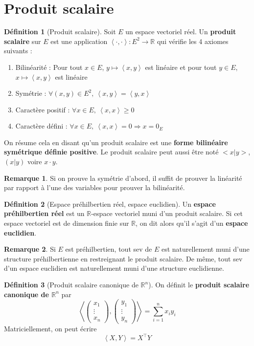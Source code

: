 \documentclass[french]{book}
\newcommand{\R}{\mathbb{R}}
\theoremstyle{plain}
\theoremstyle{definition}
\newtheorem{dfn}{Définition}[chapter]
\newtheorem{rmq}{Remarque}[chapter]
\theoremstyle{remark}
\begin{document}
\section{Produit scalaire}
\begin{dfn}[Produit scalaire]
	Soit $E$ un espace vectoriel réel. Un \textbf{produit scalaire} sur $E$ est une application $\left\langle\cdot,\cdot\right\rangle:E^2\rightarrow\R$ qui vérifie les 4 axiomes suivants :
	\begin{enumerate}
		\item Bilinéarité : Pour tout $x\in E$, $y\mapsto\left\langle x,y\right\rangle$ est linéaire et pour tout $y\in E$, $x\mapsto\left\langle x,y\right\rangle$ est linéaire
		\item Symétrie : $\forall(x,y)\in E^2,\ \left\langle x,y\right\rangle=\left\langle y,x\right\rangle$
		\item Caractère positif : $\forall x\in E,\ \left\langle x,x\right\rangle \geqslant 0$
		\item Caractère défini : $\forall x\in E,\ \left\langle x,x\right\rangle=0 \Longrightarrow x=0_E$
	\end{enumerate} On résume cela en disant qu'un produit scalaire est une \textbf{forme bilinéaire symétrique définie positive}. Le produit scalaire peut aussi être noté $<x|y>$, $(x|y)$ voire $x\cdot y$.
\end{dfn}
\begin{rmq} Si on prouve la symétrie d'abord, il suffit de prouver la linéarité par rapport à l'une des variables pour prouver la bilinéarité. \end{rmq}
\begin{dfn}[Espace préhilbertien réel, espace euclidien]
	Un \textbf{espace préhilbertien réel} est un $\R$-espace vectoriel muni d'un produit scalaire. Si cet espace vectoriel est de dimension finie sur $\R$, on dit alors qu'il s'agit d'un \textbf{espace euclidien}.
\end{dfn}
\begin{rmq} Si $E$ est préhilbertien, tout sev de $E$ est naturellement muni d'une structure préhilbertienne en restreignant le produit scalaire. De même, tout sev d'un espace euclidien est naturellement muni d'une structure euclidienne. \end{rmq}
\begin{dfn}[Produit scalaire canonique de $\R^n$]
	On définit le \textbf{produit scalaire canonique de $\R^n$} par $$\left\langle \begin{pmatrix}x_1 \\ \vdots \\ x_n\end{pmatrix}, \begin{pmatrix}y_1 \\ \vdots \\ y_n\end{pmatrix}\right\rangle=\sum_{i=1}^{n}x_iy_i$$ Matriciellement, on peut écrire $$\left\langle X,Y\right\rangle=X^\top Y$$
\end{dfn}
\end{document}
